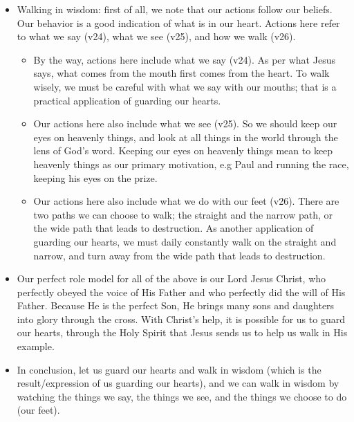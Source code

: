 \begin{itemize}
{  and if we truly give our heart to Jesus, the entire life will be
  transformed, not just selected portions.}
  \item{Walking in wisdom: first of all, we note that our actions follow our
  beliefs.  Our behavior is a good indication of what is in our heart. Actions here refer to what we say (v24), what we see (v25), and how we walk (v26).
  \begin{itemize}
    \item{By the way, actions here include what we say (v24).  As per what
    Jesus says, what comes from the mouth first comes from the heart.  To
    walk wisely, we must be careful with what we say with our mouths; that is
    a practical application of guarding our hearts.}
    \item{Our actions here also include what we see (v25).  So we should keep
    our eyes on heavenly things, and look at all things in the world through
    the lens of God's word.  Keeping our eyes on heavenly things mean to keep
    heavenly things as our primary motivation, e.g Paul and running the race,
    keeping his eyes on the prize.}
    \item{Our actions here also include what we do with our feet (v26).
    There are two paths we can choose to walk; the straight and the narrow
    path, or the wide path that leads to destruction.  As another application
    of guarding our hearts, we must daily constantly walk on the straight and
    narrow, and turn away from the wide path that leads to destruction.}
  \end{itemize}}
  \item{Our perfect role model for all of the above is our Lord Jesus Christ,
  who perfectly obeyed the voice of His Father and who perfectly did the will
  of His Father.  Because He is the perfect Son, He brings many sons and
  daughters into glory through the cross.  With Christ's help, it is possible
  for us to guard our hearts, through the Holy Spirit that Jesus sends us to
  help us walk in His example.}
  \item{In conclusion, let us guard our hearts and walk in wisdom (which is
  the result/expression of us guarding our hearts), and we can walk in wisdom
  by watching the things we say, the things we see, and the things we choose
  to do (our feet).}

\end{itemize}